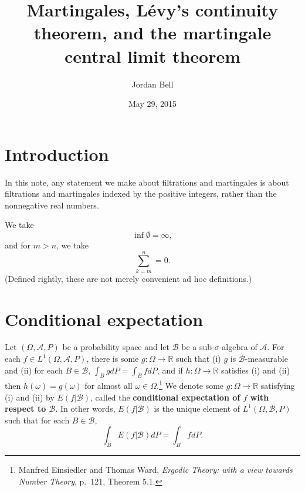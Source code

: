 \documentclass{article}
\theoremstyle{definition}
\begin{document}
\title{Martingales, Lévy's continuity theorem, and the martingale central limit theorem}
\author{Jordan Bell}
\date{May 29, 2015}

\maketitle


\section{Introduction}
In this note, any statement we make about filtrations and martingales is about filtrations and martingales indexed by the positive integers,
rather than the nonnegative real numbers.

We take
\[
\inf \emptyset = \infty,
\]
and for $m>n$, we take
\[
\sum_{k=m}^n = 0.
\]
(Defined rightly, these are not merely convenient  ad hoc definitions.)


\section{Conditional expectation}
Let $(\Omega,\mathscr{A},P)$ be a probability space and let
$\mathscr{B}$ be a sub-$\sigma$-algebra of $\mathscr{A}$. 
For each $f \in L^1(\Omega,\mathscr{A},P)$, there is some
$g:\Omega \to \mathbb{R}$ such that
(i) $g$ is $\mathscr{B}$-measurable and (ii) for each $B \in \mathscr{B}$,
$\int_B g dP = \int_B f dP$, and if $h:\Omega \to \mathbb{R}$ satisfies (i) and (ii) then
$h(\omega)=g(\omega)$ for almost all $\omega \in \Omega$.\footnote{Manfred Einsiedler and Thomas Ward,
{\em Ergodic Theory: with a view towards Number Theory}, p.~121, Theorem 5.1.}
We denote some $g:\Omega \to \mathbb{R}$ satisfying (i) and (ii) by $E(f|\mathscr{B})$, called
the \textbf{conditional expectation of $f$ with respect to $\mathscr{B}$}.
In other words,
$E(f|\mathscr{B})$ is the unique element of $L^1(\Omega,\mathscr{B},P)$
such that for each $B \in \mathscr{B}$,
\[
\int_B E(f|\mathscr{B}) dP = \int_B f dP.
\] 
\end{document}
